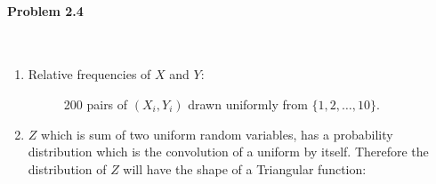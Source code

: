 \documentclass[12pt, letterpaper]{scrartcl}
\begin{document}
\paragraph*{Problem 2.4} \hfill\\
    \begin{enumerate}[((a))]
        \item Relative frequencies of $X$ and $Y$: 
        \begin{figure}[h!]
            \centering
            \hfill
            \vfill
            \caption{200 pairs of $(X_i, Y_i)$ drawn uniformly from $\{1,2, \dots,10\}$.}
        \end{figure}
        \clearpage
        \item $Z$ which is sum of two uniform random variables, has a probability distribution which is the convolution of a uniform by itself. Therefore the distribution of $Z$ will have the shape of a Triangular function:

\end{enumerate}
\end{document}
